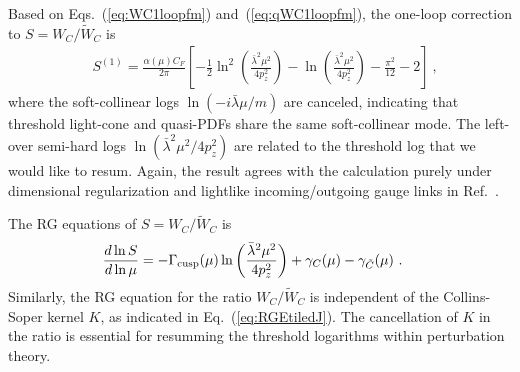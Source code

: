 \documentclass[a4paper,11pt]{article}
\begin{document}
Based on Eqs.~(\ref{eq:WC1loopfm}) and~(\ref{eq:qWC1loopfm}), the one-loop correction to $S=W_C/\tilde{W}_C$ is
\begin{align}\label{eq:WCoverWCt}
&S^{(1)} =\frac{\alpha(\mu) C_F}{2 \pi}\left[ -\frac{1}{2}\ln^2\left(\frac{\bar{\lambda}^2 \mu^2}{4 p_z^2}\right) - \ln\left(\frac{\bar{\lambda}^2 \mu^2 }{4 p_z^2}\right) - \frac{\pi^2}{12} -  2  \right] \ ,
\end{align}
where the soft-collinear logs $\ln\left(-i \bar{\lambda} \mu/m \right)$ are canceled, indicating that threshold light-cone and quasi-PDFs share the same soft-collinear mode.  
The left-over semi-hard logs $\ln\left(\bar{\lambda}^2 \mu^2/4 p_z^2\right)$ are related to the threshold log that we would like to resum. Again, the result agrees with the calculation purely under dimensional regularization and lightlike incoming/outgoing gauge links in Ref.~\cite{Ji:2023pba}.

The RG equations of $S=W_C/\tilde{W}_C$ is 
\begin{align}
&\frac{d\ln S}{d\ln \mu} = -\Gamma_{\rm cusp}(\mu) \ln\left(\frac{
\bar{\lambda}^2\mu^2}{4p_z^2}\right)  + \gamma_{C}(\mu)-\gamma_{\tilde C}(\mu) \ .
\end{align}
Similarly, the RG equation for the ratio $W_C / \tilde{W}_C$ is independent of the Collins-Soper kernel $K$, as indicated in Eq.~(\ref{eq:RGEtiledJ}). The cancellation of $K$ in the ratio is essential for resumming the threshold logarithms within perturbation theory.
\end{document}
